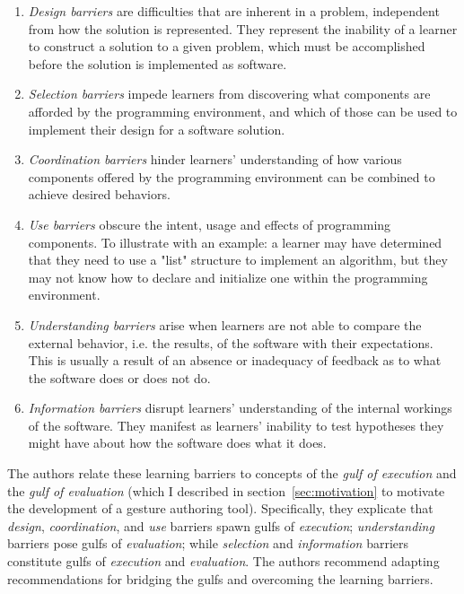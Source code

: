 \begin{enumerate}
\item \emph{Design barriers} are difficulties that are inherent in a problem, independent from how the solution is represented. They represent the inability of a learner to construct a solution to a given problem, which must be accomplished before the solution is implemented as software.
\item \emph{Selection barriers} impede learners from discovering what components are afforded by the programming environment, and which of those can be used to implement their design for a software solution.
\item \emph{Coordination barriers} hinder learners' understanding of how various components offered by the programming environment can be combined to achieve desired behaviors.
\item \emph{Use barriers} obscure the intent, usage and effects of programming components. To illustrate with an example: a learner may have determined that they need to use a "list" structure to implement an algorithm, but they may not know how to declare and initialize one within the programming environment.
\item \emph{Understanding barriers} arise when learners are not able to compare the external behavior, i.e. the results, of the software with their expectations. This is usually a result of an absence or inadequacy of feedback as to what the software does or does not do.
\item \emph{Information barriers} disrupt learners' understanding of the internal workings of the software. They manifest as learners' inability to test hypotheses they might have about how the software does what it does.
\end{enumerate}

The authors relate these learning barriers to  concepts of the \emph{gulf of execution} and the \emph{gulf of evaluation} (which I described in section~\ref{sec:motivation} to motivate the development of a gesture authoring tool). Specifically, they explicate that \emph{design}, \emph{coordination}, and \emph{use} barriers spawn gulfs of \emph{execution}; \emph{understanding} barriers pose gulfs of \emph{evaluation}; while \emph{selection} and \emph{information} barriers constitute gulfs of \emph{execution} and \emph{evaluation}. The authors recommend adapting  recommendations for bridging the gulfs and overcoming the learning barriers.


